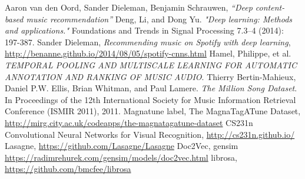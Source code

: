 \documentclass[11pt, a4paper]{article}
\begin{document}
  \begin{thebibliography}{9}
    \sf
      Aaron van den Oord, Sander Dieleman, Benjamin Schrauwen, \emph{``Deep
      content-based music recommendation''}
      Deng, Li, and Dong Yu. \emph{"Deep learning: Methods and applications."}
      Foundations and Trends in Signal Processing 7.3–4 (2014): 197-387.
      Sander Dieleman, \emph{Recommending music on Spotify with deep learning},
      \url{http://benanne.github.io/2014/08/05/spotify-cnns.html}
      Hamel, Philippe, et al. \emph{TEMPORAL POOLING AND MULTISCALE LEARNING
      FOR AUTOMATIC ANNOTATION AND RANKING OF MUSIC AUDIO}.
      Thierry Bertin-Mahieux, Daniel P.W. Ellis, Brian Whitman, and Paul
      Lamere. \emph{The Million Song Dataset}. In Proceedings of the 12th
      International Society for Music Information Retrieval Conference (ISMIR
      2011), 2011.
      Magnatune label, The MagnaTagATune Dataset, \url{
      http://mirg.city.ac.uk/codeapps/the-magnatagatune-dataset}
      CS231n Convolutional Neural Networks for Visual Recognition,
      \url{http://cs231n.github.io/}
      Lasagne, \url{https://github.com/Lasagne/Lasagne}
      Doc2Vec, gensim \url{https://radimrehurek.com/gensim/models/doc2vec.html}
      librosa, \url{https://github.com/bmcfee/librosa}
  \end{thebibliography}
\end{document}
